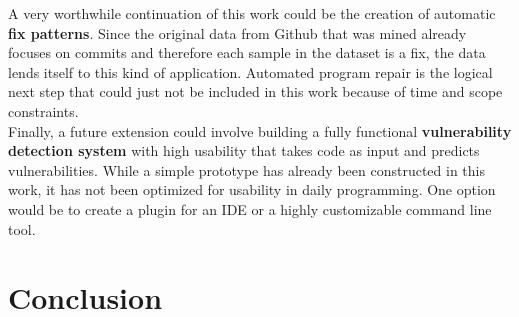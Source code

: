 \documentclass[
a4paper,
pagesize,
pdftex,
12pt,
twoside, %
BCOR=5mm, %
ngerman,
fleqn,
final,
]{scrartcl}
\begin{document}
	A very worthwhile continuation of this work could be the creation of automatic \textbf{fix patterns}. Since the original data from Github that was mined already focuses on commits and therefore each sample in the dataset is a fix, the data lends itself to this kind of application. Automated program repair is the logical next step that could just not be included in this work because of time and scope constraints.\\
	Finally, a future extension could involve building a fully functional \textbf{vulnerability detection system} with high usability that takes code as input and predicts vulnerabilities. While a simple prototype has already been constructed in this work, it has not been optimized for usability in daily programming. One option would be to create a plugin for an IDE or a highly customizable command line tool.
	
	
	
	
	
	
	
	
	\newpage
	\section{Conclusion}
	
\end{document}
